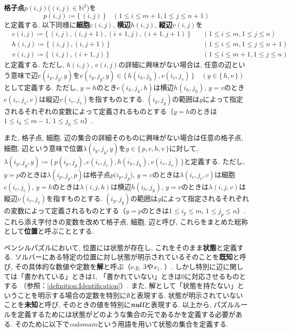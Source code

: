\begin{definition}[格子点$p(i,j)$, 細胞$c(i,j)$, 横辺$h(i,j)$, 縦辺$v(i,j)$, 位置]\label{definition:VariableAtBoard}
  \textbf{格子点}$p(i,j)$($(i,j)\in \mathbb{N}^2$)を
  \begin{equation}
    p(i,j)\coloneqq \{\,(i,j)\,\} \quad (1\le i \le m+1, 1\le j \le n+1)
  \end{equation}
  と定義する. 以下同様に\textbf{細胞}$c(i,j)$, \textbf{横辺}$h(i,j)$, \textbf{縦辺}$v(i,j)$を
  \begin{align}
     & c(i,j)\coloneqq  \{\,(i,j), (i,j+1), (i+1,j), (i+1,j+1)\,\}  \quad & (1\le i \le m, 1\le j \le n)   \\
     & h(i,j)\coloneqq  \{\,(i,j), (i,j+1)\,\}                      \quad & (1\le i \le m, 1\le j \le n+1) \\
     & v(i,j)\coloneqq  \{\,(i,j), (i+1,j)\,\}                      \quad & (1\le i \le m+1, 1\le j \le n)
  \end{align}
  と定義する. ただし, $h(i,j)$, $v(i,j)$の詳細に興味がない場合は, 任意の辺という意味で辺$e(i_y,j_y,y)$を$e(i_y,j_y,y) \in \{\,h(i_h,j_h), v(i_v,j_v)\,\} \quad (y \in \{\,h,v\,\})$として定義する.   ただし, $y=h$のとき$e(i_h,j_h,h)$は横辺$h(i_h,j_h)$, $y=v$のとき$e(i_v,j_v,v)$は縦辺$v(i_v,j_v)$を指すものとする. $(i_y,j_y)$の範囲は$y$によって指定されるそれぞれの変数によって定義されるものとする（$y=h$のときは$1\le i_h \le m-1$, $1\le j_h \le n$）.

  また, 格子点, 細胞, 辺の集合の詳細そのものに興味がない場合は任意の格子点, 細胞, 辺という意味で位置$\lambda(i_y,j_y,y)$を$y \in \{\,p,c,h,v\,\}$に対して, $\lambda(i_y,j_y,y) \coloneqq \{\,p(i_p,j_p),c(i_c,j_c),h(i_h,j_h),v(i_v,j_v)\,\}$と定義する. ただし, $y=p$のときは$\lambda(i_p,j_p,p)$は格子点$p(i_p,j_p$), $y=c$のときは$\lambda(i_c,j_c,c)$は細胞$c(i_c,j_c)$, $y=h$のときは$\lambda(i,j,h)$は横辺$h(i_h,j_h)$, $y=v$のときは$\lambda(i,j,v)$は縦辺$v(i_v,j_v)$を指すものとする. $(i_y,j_y)$の範囲は$y$によって指定されるそれぞれの変数によって定義されるものとする（$y=p$のときは$1\le i_p \le m$, $1\le j_p \le n$）.
  これら添え字付きの変数を改めて格子点, 細胞, 辺と呼び, これらをまとめた総称として\textbf{位置}と呼ぶこととする.
\end{definition}
ペンシルパズルにおいて, 位置には状態が存在し, これをそのまま\textbf{状態}と定義する. ソルバーにある特定の位置に対し状態が明示されているそのことを\textbf{既知}と呼び, その具体的な数値や定数を\textbf{解}と呼ぶ（e.g. 3や$x_1$. ）. しかし特別に辺に関しては「書かれている」ときは1, 「書かれていない」ときは0に対応させるものとする （参照：\cref{definition:Identification}）. また, 解として「状態を持たない」ということを明示する場合の定数を特別に$\emptyset$と表現する. 状態が明示されていないことを\textbf{未知}と呼び, そのときの値を特別に\textbf{\textit{null}}と表現する.
以上から, パズルルールを定義するためには状態がどのような集合の元であるかを定義する必要がある. そのために以下で\textit{codomain}という用語を用いて状態の集合を定義する.

